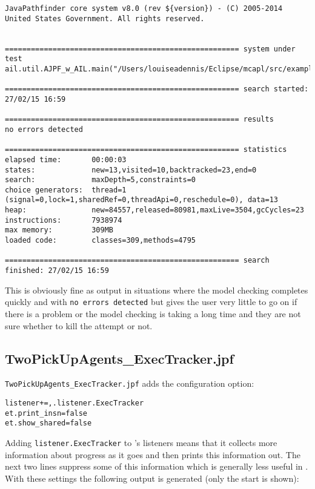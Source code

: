 \begin{verbatim}
JavaPathfinder core system v8.0 (rev ${version}) - (C) 2005-2014 United States Government. All rights reserved.


====================================================== system under test
ail.util.AJPF_w_AIL.main("/Users/louiseadennis/Eclipse/mcapl/src/examples/gwendolen/ajpf_tutorials/tutorial2/TwoPickUpAgents.ail","/Users/louiseadennis/Eclipse/mcapl/src/examples/gwendolen/ajpf_tutorials/tutorial2/PickUpAgent.psl","1")

====================================================== search started: 27/02/15 16:59

====================================================== results
no errors detected

====================================================== statistics
elapsed time:       00:00:03
states:             new=13,visited=10,backtracked=23,end=0
search:             maxDepth=5,constraints=0
choice generators:  thread=1 (signal=0,lock=1,sharedRef=0,threadApi=0,reschedule=0), data=13
heap:               new=84557,released=80981,maxLive=3504,gcCycles=23
instructions:       7938974
max memory:         309MB
loaded code:        classes=309,methods=4795

====================================================== search finished: 27/02/15 16:59
\end{verbatim}

This is obviously fine as output in situations where the model checking completes quickly and with \texttt{no errors detected} but gives the user very little to go on if there is a problem or the model checking is taking a long time and they are not sure whether to kill the attempt or not.

\subsection{TwoPickUpAgents\_ExecTracker.jpf}

\texttt{TwoPickUpAgents\_ExecTracker.jpf} adds the configuration option:

\begin{verbatim}
listener+=,.listener.ExecTracker
et.print_insn=false
et.show_shared=false
\end{verbatim}

Adding \texttt{listener.ExecTracker} to \jpf's listeners means that it collects more information about progress as it goes and then prints this information out.  The next two lines suppress some of this information which is generally less useful in \ajpf.  With these settings the following output is generated (only the start is shown):

